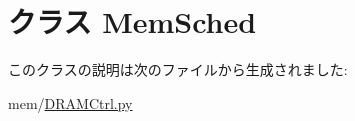 \hypertarget{classDRAMCtrl_1_1MemSched}{
\section{クラス MemSched}
\label{classDRAMCtrl_1_1MemSched}
}


このクラスの説明は次のファイルから生成されました:\begin{DoxyCompactItemize}
\item 
mem/\hyperlink{DRAMCtrl_8py}{DRAMCtrl.py}\end{DoxyCompactItemize}

